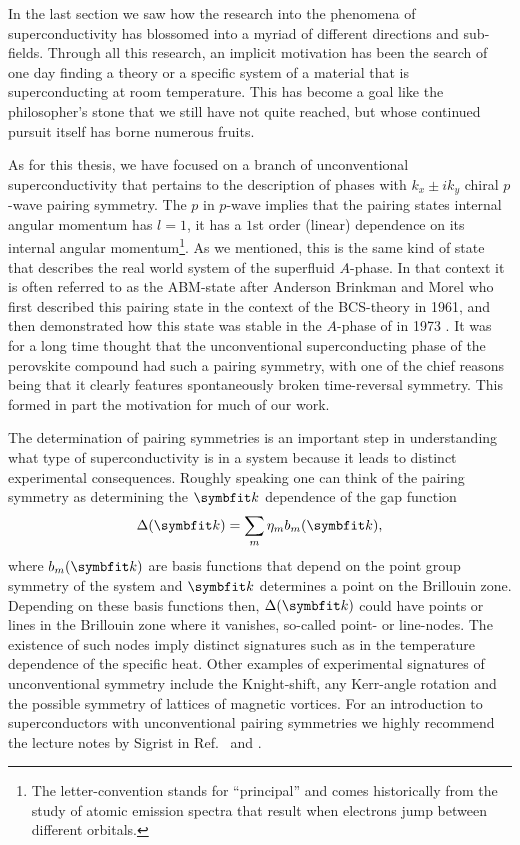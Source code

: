 In the last section we saw how the research into the phenomena of superconductivity has blossomed into a myriad of different directions and sub-fields. Through
all this research, an implicit motivation has been the search of one day finding a theory or a specific system of a material that is superconducting at
room temperature. This has become a goal like the philosopher's stone that we still have not quite reached, but whose continued pursuit itself has borne
numerous fruits. 

As for this thesis, we have focused on a branch of unconventional superconductivity that pertains to the description of phases with
$k_x\pm ik_y$ chiral $p$-wave pairing symmetry. The $p$ in $p$-wave implies that the pairing states internal angular momentum has $l=1$, \ie it has a $1$st order (linear) dependence
on its internal angular momentum\footnote{The letter-convention stands for ``principal'' and comes historically from the study of atomic emission spectra 
that result when electrons jump between different orbitals.}. As we mentioned, this is the same kind of state that describes the real world system of the
 superfluid $A$-phase. In that context it is often referred to as the ABM-state after Anderson Brinkman and Morel who first described this pairing
state in the context of the BCS-theory \cite{Anderson61} in 1961, and then demonstrated how this state was stable in the $A$-phase
of  in 1973 \cite{Anderson73}. It was for a long time thought that the unconventional superconducting phase of the perovskite compound 
had such a pairing symmetry, with one of the chief reasons being that it clearly features spontaneously broken time-reversal symmetry. This
formed in part the motivation for much of our work.

The determination of pairing symmetries is an important step in understanding what type of superconductivity is in a system because it leads to distinct
experimental consequences. Roughly speaking one can think of the pairing symmetry as determining the $\v{k}$ dependence of the gap function
\begin{equation}
    \label{eq:Intro:GapFunc}
    \Delta(\v{k}) = \sum_{m}\eta_mb_m(\v{k}),
\end{equation}
where $b_m(\v{k})$ are basis functions that depend on the point group symmetry of the system and $\v{k}$ determines a point on the Brillouin zone. Depending
on these basis functions then, $\Delta(\v{k})$ could have points or lines in the Brillouin zone where it vanishes, so-called point- or line-nodes. The 
existence of such nodes imply distinct signatures such as in the temperature dependence of the specific heat. Other examples of experimental signatures
of unconventional symmetry include
the Knight-shift, any Kerr-angle rotation and the possible symmetry of lattices of magnetic vortices. For an introduction to superconductors with
unconventional pairing symmetries we highly recommend the lecture notes by Sigrist in Ref.~\cite{Sigrist05} and \cite{Sigrist09}.


